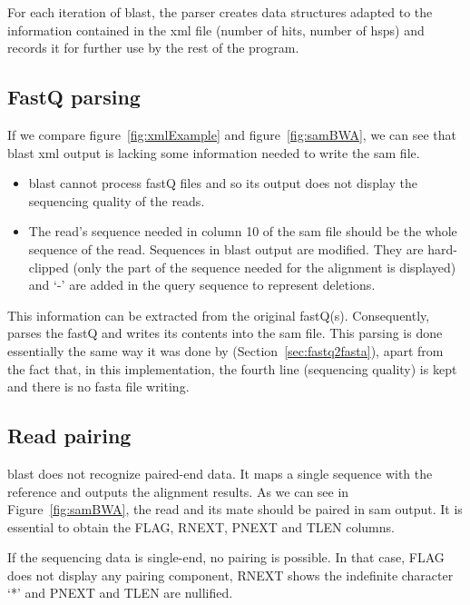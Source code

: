 For each iteration of \gls{blast}, the parser creates data structures adapted to the information contained in the \gls{xml} file (number of hits, number of \glspl{hsp}) and records it for further use by the rest of the program.


\subsection{FastQ parsing}
If we compare figure~\ref{fig:xmlExample} and figure~\ref{fig:samBWA}, we can see that \gls{blast} \gls{xml} output is lacking some information needed to write the \gls{sam} file.
\begin{itemize}
    \item \gls{blast} cannot process fastQ files and so its output does not display the sequencing quality of the reads.
    \item The read's sequence needed in column 10 of the \gls{sam} file should be the whole sequence of the read. Sequences in \gls{blast} output are modified. They are hard-clipped (only the part of the sequence needed for the alignment is displayed) and `-' are added in the query sequence to represent deletions.
\end{itemize}

This information can be extracted from the original fastQ(s). Consequently, \blastobam{} parses the fastQ and writes its contents into the \gls{sam} file.
This parsing is done essentially the same way it was done by \fastqtofasta{} (Section~\ref{sec:fastq2fasta}), apart from the fact that, in this implementation, the fourth line (sequencing quality) is kept and there is no fasta file writing.


\subsection{Read pairing}
\gls{blast} does not recognize paired-end data.
It maps a single sequence with the reference and outputs the alignment results.
As we can see in Figure~\ref{fig:samBWA}, the read and its mate should be paired in \gls{sam} output.
It is essential to obtain the FLAG, RNEXT, PNEXT and TLEN columns.

If the sequencing data is single-end, no pairing is possible. In that case, FLAG does not display any pairing component, RNEXT shows the indefinite character `*' and PNEXT and TLEN are nullified.

